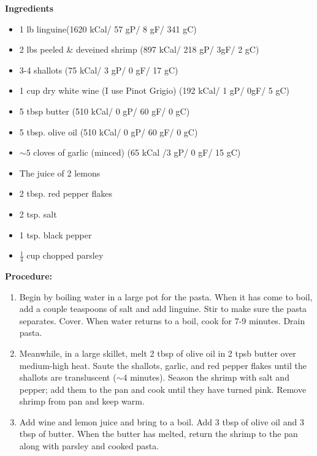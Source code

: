 \begin{multicols}{2}
\textbf{Ingredients}
\begin{itemize}
\item 1 lb linguine\quad (1620 kCal/ 57 gP/ 8 gF/ 341 gC)
\item 2 lbs peeled \& deveined shrimp \newline(897 kCal/ 218 gP/ 3gF/ 2 gC)
\item 3-4 shallots  \quad (75 kCal/ 3 gP/ 0 gF/ 17 gC)
\item 1 cup dry white wine (I use Pinot Grigio)
\newline  (192 kCal/ 1 gP/ 0gF/ 5 gC)
\item 5 tbsp butter \quad (510 kCal/ 0 gP/ 60 gF/ 0 gC)
\item 5 tbsp. olive oil \quad (510 kCal/ 0 gP/ 60 gF/ 0 gC)
\item $\sim 5$ cloves of garlic (minced) (65 kCal /3 gP/ 0 gF/ 15 gC)
\item The juice of 2 lemons
\item 2 tbsp. red pepper flakes
\item 2 tsp. salt
\item 1 tsp. black pepper
\item $\frac{1}{4}$ cup chopped parsley 



\end{itemize}


\columnbreak
\textbf{Procedure:}
\medskip


\begin{enumerate}
\item Begin by boiling water in a large pot for the pasta. When it has come to boil, add a couple teaspoons of salt and add linguine. Stir to make sure the pasta separates. Cover. When water returns to a boil, cook for 7-9 minutes. Drain pasta. 


\medskip
\item Meanwhile, in a large skillet, melt 2 tbsp of olive oil in 2 tpsb butter over medium-high heat. Saute the shallots, garlic, and red pepper flakes until the shallots are transluscent ($\sim$4 minutes). Season the shrimp with salt and pepper; add them to the pan and cook until they have turned pink. Remove shrimp from pan and keep warm. 
\medskip

\item Add wine and lemon juice and bring to a boil. Add 3 tbsp of olive oil and 3 tbsp of butter. When the butter has melted, return the shrimp to the pan along with parsley and cooked pasta. 
\newline 


\end{enumerate}
\end{multicols}
